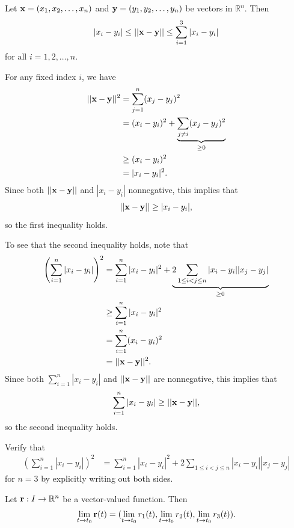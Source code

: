 \documentclass[12pt,letterpaper,reqno]{article}
\numberwithin{equation}{section}
\newcommand{\R}{\ensuremath{\mathbb R}}
\newcommand{\bx}{{\bf x}}
\newcommand{\by}{{\bf y}}
\newcommand{\bbr}{{\bf r}}
\begin{document}
{\begin{lem}\label{lem:useful_vector_inequalities}
Let $\bx=(x_1,x_2,\dots,x_n)$ and $\by=(y_1,y_2,\dots,y_n)$ be vectors in $\R^n$. Then
\begin{align*}
	|x_i-y_i| \leq ||\bx-\by|| \leq \sum_{i=1}^3|x_i-y_i|
\end{align*}	
for all $i=1,2,\dots,n$.
\end{lem}

\begin{pf}
For any fixed index $i$, we have
\begin{align*}
	||\bx-\by||^2&=\sum_{j=1}^n(x_j-y_j)^2 \\
	&=(x_i-y_i)^2+\underbrace{\sum_{j \neq i}(x_j-y_j)^2}_{\geq 0} \\
	&\geq (x_i-y_i)^2 \\
	&=|x_i-y_i|^2.
\end{align*}	
Since both $||\bx-\by||$ and $|x_i-y_i|$ nonnegative, this implies that 
\begin{align*}
	||\bx-\by||\geq |x_i-y_i|,
\end{align*}
so the first inequality holds. 

To see that the second inequality holds, note that 
\begin{align*}
	\left(\sum_{i=1}^n|x_i-y_i|\right)^2&=\sum_{i=1}^n|x_i-y_i|^2+\underbrace{2\sum_{1 \leq i<j \leq n}|x_i-y_i||x_j-y_j|}_{\geq 0} \\
	&\geq \sum_{i=1}^n|x_i-y_i|^2 \\
	&= \sum_{i=1}^n(x_i-y_i)^2 \\
	&=||\bx-\by||^2.
\end{align*}
Since both $\sum_{i=1}^n|x_i-y_i|$ and $||\bx-\by||$ are nonnegative, this implies that 
\begin{align*}
	\sum_{i=1}^n|x_i-y_i| \geq ||\bx-\by||,
\end{align*}
so the second inequality holds.
\end{pf}

\begin{exercise}
Verify that	
\begin{align*}
	\left(\sum_{i=1}^n|x_i-y_i|\right)^2&=\sum_{i=1}^n|x_i-y_i|^2+2\sum_{1 \leq i<j \leq n}|x_i-y_i||x_j-y_j|
\end{align*}
for $n=3$ by explicitly writing out both sides.
\end{exercise}


\begin{thm}\label{thm:limit_of_a_vector-valued_function}
Let $\bbr:I\to \mathbb{R}^n$ be a vector-valued function. Then
	\begin{align}\label{eq:lim_defn_for_vv_f}
		\lim_{t\to t_0}{\bf r}(t)=(\lim_{t\to t_0}r_1(t),\lim_{t\to t_0}r_2(t),\lim_{t\to t_0}r_3(t)).
	\end{align}	
\end{thm}

}
\end{document}
